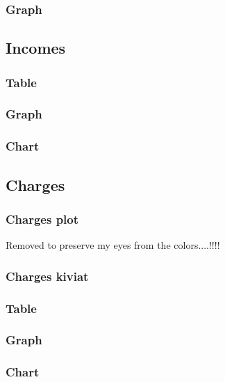 \documentclass[8pt]{article} %
\begin{document}
\subsubsection{Graph}
%
%

\subsection{Incomes}
%

\subsubsection{Table}

\subsubsection{Graph}

\subsubsection{Chart}


\subsection{Charges}


\subsubsection{Charges plot}
Removed to preserve my eyes from the colors....!!!!\\

\subsubsection{Charges kiviat}


\subsubsection{Table}


\subsubsection{Graph}


\subsubsection{Chart}
\end{document}
